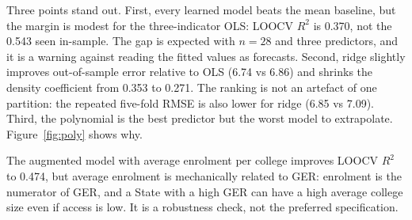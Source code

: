 \begin{table}[htbp]
\centering
\caption{Model comparison, 28 States, 2021-22. LOOCV is the primary criterion; repeated five-fold CV is a stability check. The baseline assigns every State the training mean. Source: \texttt{table03\_model\_comparison.csv}.}
\label{tab:models}
\end{table}

Three points stand out. First, every learned model beats the mean baseline, but the margin is modest for the three-indicator OLS: LOOCV \(R^2\) is 0.370, not the 0.543 seen in-sample. The gap is expected with \(n = 28\) and three predictors, and it is a warning against reading the fitted values as forecasts. Second, ridge slightly improves out-of-sample error relative to OLS (6.74 vs 6.86) and shrinks the density coefficient from 0.353 to 0.271. The ranking is not an artefact of one partition: the repeated five-fold RMSE is also lower for ridge (6.85 vs 7.09). Third, the polynomial is the best predictor but the worst model to extrapolate. Figure~\ref{fig:poly} shows why.

The augmented model with average enrolment per college improves LOOCV \(R^2\) to 0.474, but average enrolment is mechanically related to GER: enrolment is the numerator of GER, and a State with a high GER can have a high average college size even if access is low. It is a robustness check, not the preferred specification.

